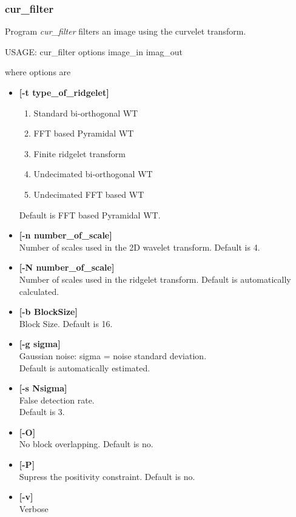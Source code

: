 \documentclass[11pt,a4paper]{article}
\begin{document}
\subsubsection{cur\_filter}

Program {\em cur\_filter} filters an image using the curvelet transform.
\begin{center}
 USAGE:  cur\_filter options image\_in imag\_out
\end{center}
where options are 
\begin{itemize}
\item {\bf [-t type\_of\_ridgelet]} \\
\begin{enumerate}
\item Standard bi-orthogonal WT
\item FFT based Pyramidal WT  
\item Finite ridgelet transform
\item Undecimated bi-orthogonal WT 
\item Undecimated FFT based WT  
\end{enumerate}
Default is FFT based Pyramidal WT.

 \item {\bf [-n number\_of\_scale]} \\
 Number of scales used in the 2D wavelet transform.
 Default is 4. 

\item {\bf [-N number\_of\_scale]} \\
 Number of scales used in the ridgelet transform.
 Default is automatically calculated.

\item {\bf [-b BlockSize]}  \\
Block Size. Default is 16.

\item {\bf [-g sigma]} \\
Gaussian noise: sigma = noise standard deviation.  \\
 Default is automatically estimated.

\item {\bf [-s Nsigma]} \\
False detection rate. \\
Default is 3.

\item {\bf [-O]}  \\
 No block overlapping. Default is no.

\item {\bf [-P]}  \\
 Supress the positivity constraint. Default is no. 

\item {\bf [-v]} \\
Verbose
\end{itemize}
\end{document}
